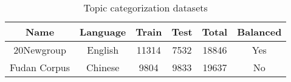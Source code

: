 \begin{table}[]
\caption{Topic categorization datasets}
\begin{tabular}{|c|c|c|c|c|c|}
\hline
Name         & Language & Train & Test & Total & Balanced \\ \hline
20Newgroup\cite{20news}   & English  & 11314 & 7532 & 18846 & Yes      \\ \hline
Fudan Corpus & Chinese  & 9804  & 9833 & 19637 & No       \\ \hline
\end{tabular}
\end{table}